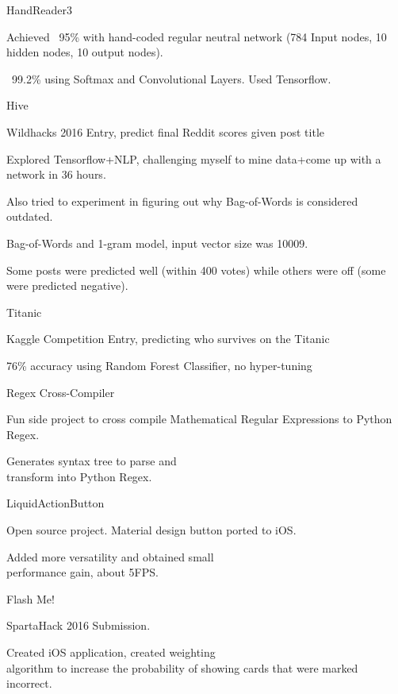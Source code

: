 \documentclass{tccv}
\newenvironment{itemize*}%
{\begin{itemize}%
    \vspace{-0.7em}
    \setlength{\itemsep}{0pt}%
    \setlength{\parskip}{0pt}}%
  {\end{itemize}}
\begin{document}
\begin{projectlist}

  {HandReader3}
  \begin{itemize*}
  \item Achieved ~95\% with hand-coded
    regular neutral network (784 Input nodes, 10 hidden nodes, 10 output nodes).
  \item ~99.2\% using Softmax and Convolutional Layers. Used Tensorflow.
  \end{itemize*}

  {Hive}
  \begin{itemize*}
  \item Wildhacks 2016 Entry, predict final Reddit scores given post title
  \item Explored Tensorflow+NLP, challenging myself to mine data+come up with a network in 36 hours.
  \item Also tried to experiment in figuring out why Bag-of-Words is considered outdated.
  \item Bag-of-Words and 1-gram model, input vector size was 10009.
  \item Some posts were predicted well (within 400 votes) while others were off (some were predicted negative).
  \end{itemize*}

  {Titanic}
  \begin{itemize*}
  \item Kaggle Competition Entry, predicting who survives on the Titanic
  \item 76\% accuracy using Random Forest Classifier, no hyper-tuning
  \end{itemize*}

  {Regex Cross-Compiler}
  \begin{itemize*}
  \item Fun side project to cross compile Mathematical Regular Expressions to Python Regex.
  \item Generates syntax tree to parse and \\
    transform into Python Regex.

  \end{itemize*}
  {LiquidActionButton}
  \begin{itemize*}
  \item Open source project. Material design button ported to iOS.
  \item Added more versatility and obtained small \\
    performance gain, about 5FPS.
  \end{itemize*}

  {Flash Me!}
  \begin{itemize*}
  \item SpartaHack 2016 Submission.
  \item Created iOS application, created weighting \\
    algorithm to increase the probability of showing cards that were marked incorrect.
  \end{itemize*}

\end{projectlist}
\end{document}
